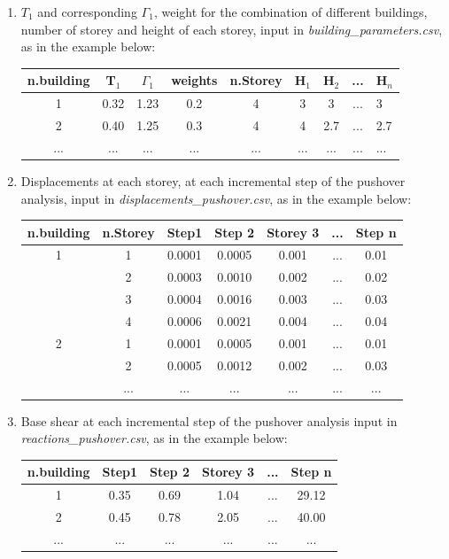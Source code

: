 \begin{enumerate}
\item $T_1$ and corresponding $\Gamma_1$, weight for the combination of different buildings, number of storey and height of each storey, input in \textit{building\_parameters.csv}, as in the example below:
	\begin{table}[H]
	\centering
	\begin{tabular}{|c|c|c|c|c|c|c|c|} \hline
	\textbf{n.building} & \textbf{T$_1$} & \textbf{$\Gamma_1$} & \textbf{weights} & \textbf{n.Storey} & \textbf{H$_1$} & \textbf{H$_2$} & ... & \textbf{H$_n$} \\  & 0.32 & 1.23 & 0.2 & 4 & 3 & 3 & ... & 3 \\  & 0.40 & 1.25 & 0.3 & 4 & 4 & 2.7 & ... & 2.7 \\ \hline
	... & ... & ... & ... & ... & ... & ... & ... & ... \\ \hline
	\end{tabular}
	\end{table}
	
\item Displacements at each storey, at each incremental step of the pushover analysis, input in \textit{displacements\_pushover.csv}, as in the example below: 
	\begin{table}[H]
	\centering
	\begin{tabular}{|c|c|c|c|c|c|c|} \hline
	\textbf{n.building} & \textbf{n.Storey} & \textbf{Step1} & \textbf{Step 2} & \textbf{Storey 3} & ... & \textbf{Step n}\\ \hline
	1 &	1 & 0.0001 &	0.0005 &	0.001 & ... & 0.01\\ \hline
	   &	2 & 0.0003 &	0.0010 &	0.002 & ... & 0.02\\ \hline
	   &	3 & 0.0004 &	0.0016 &	0.003 & ... & 0.03\\ \hline
	   &	4 & 0.0006 &	0.0021 &	0.004 & ... & 0.04\\ \hline
	2 &	1 & 0.0001 &	0.0005 &	0.001 & ... & 0.01\\ \hline
	   &	2 & 0.0005 &	0.0012 &	0.002 & ... & 0.03\\ \hline
	   &	... & ... &	... &	... & ... & ...\\ \hline
	\end{tabular}
	\end{table}
	
\item Base shear at each incremental step of the pushover analysis input in \textit{reactions\_pushover.csv}, as in the example below:
	\begin{table}[H]
	\centering
	\begin{tabular}{|c|c|c|c|c|c|} \hline
	\textbf{n.building} &	\textbf{Step1} & \textbf{Step 2} & \textbf{Storey 3} & ... & \textbf{Step n} \\ \hline
	1 & 0.35 & 0.69 & 1.04 & ... & 29.12\\ \hline
	2 & 0.45 & 0.78 & 2.05 & ... & 40.00\\ \hline
	... & ... & ... & ... & ... & ...\\ \hline
	\end{tabular}
	\end{table}
	

\end{enumerate}

